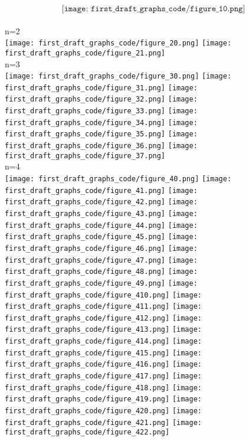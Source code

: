 \documentclass{Assignment}
\begin{document}
$$\texttt{[image: first\_draft\_graphs\_code/figure\_10.png]}$$\\
n=2\\
\texttt{[image: first\_draft\_graphs\_code/figure\_20.png]} \texttt{[image: first\_draft\_graphs\_code/figure\_21.png]}
\\
n=3\\
\texttt{[image: first\_draft\_graphs\_code/figure\_30.png]}
\texttt{[image: first\_draft\_graphs\_code/figure\_31.png]}
\texttt{[image: first\_draft\_graphs\_code/figure\_32.png]}
\texttt{[image: first\_draft\_graphs\_code/figure\_33.png]}
\texttt{[image: first\_draft\_graphs\_code/figure\_34.png]}
\texttt{[image: first\_draft\_graphs\_code/figure\_35.png]}
\texttt{[image: first\_draft\_graphs\_code/figure\_36.png]}
\texttt{[image: first\_draft\_graphs\_code/figure\_37.png]}
\\
n=4\\
\texttt{[image: first\_draft\_graphs\_code/figure\_40.png]}
\texttt{[image: first\_draft\_graphs\_code/figure\_41.png]}
\texttt{[image: first\_draft\_graphs\_code/figure\_42.png]}
\texttt{[image: first\_draft\_graphs\_code/figure\_43.png]}
\texttt{[image: first\_draft\_graphs\_code/figure\_44.png]}
\texttt{[image: first\_draft\_graphs\_code/figure\_45.png]}
\texttt{[image: first\_draft\_graphs\_code/figure\_46.png]}
\texttt{[image: first\_draft\_graphs\_code/figure\_47.png]}
\texttt{[image: first\_draft\_graphs\_code/figure\_48.png]}
\texttt{[image: first\_draft\_graphs\_code/figure\_49.png]}
\texttt{[image: first\_draft\_graphs\_code/figure\_410.png]}
\texttt{[image: first\_draft\_graphs\_code/figure\_411.png]}
\texttt{[image: first\_draft\_graphs\_code/figure\_412.png]}
\texttt{[image: first\_draft\_graphs\_code/figure\_413.png]}
\texttt{[image: first\_draft\_graphs\_code/figure\_414.png]}
\texttt{[image: first\_draft\_graphs\_code/figure\_415.png]}
\texttt{[image: first\_draft\_graphs\_code/figure\_416.png]}
\texttt{[image: first\_draft\_graphs\_code/figure\_417.png]}
\texttt{[image: first\_draft\_graphs\_code/figure\_418.png]}
\texttt{[image: first\_draft\_graphs\_code/figure\_419.png]}
\texttt{[image: first\_draft\_graphs\_code/figure\_420.png]}
\texttt{[image: first\_draft\_graphs\_code/figure\_421.png]}
\texttt{[image: first\_draft\_graphs\_code/figure\_422.png]}
\end{document}
